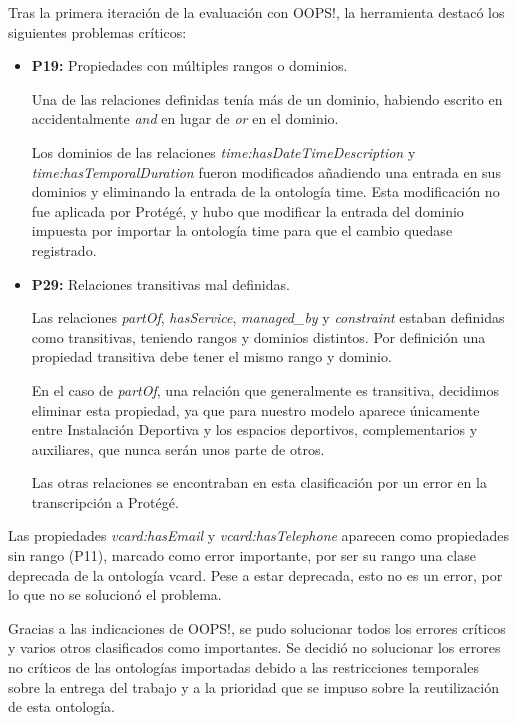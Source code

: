 \documentclass[a4paper,12pt]{article}
\begin{document}
	Tras la primera iteración de la evaluación con OOPS!, la herramienta destacó los siguientes problemas críticos:
	
	\begin{itemize}
		\item \textbf{P19:} Propiedades con múltiples rangos o dominios.
		
		Una de las relaciones definidas tenía más de un dominio, habiendo escrito en  accidentalmente \textit{and} en lugar de \textit{or} en el dominio.
		
		Los dominios de las relaciones \textit{time:hasDateTimeDescription} y \textit{time:hasTemporalDuration} fueron modificados añadiendo una entrada en sus dominios y eliminando la entrada de la ontología time. Esta modificación no fue aplicada por Protégé, y hubo que modificar la entrada del dominio impuesta por importar la ontología time para que el cambio quedase registrado.
		
		\item \textbf{P29:} Relaciones transitivas mal definidas.
		
		Las relaciones \textit{partOf}, \textit{hasService}, \textit{managed\_by} y \textit{constraint} estaban definidas como transitivas, teniendo rangos y dominios distintos. Por definición una propiedad transitiva debe tener el mismo rango y dominio.
		
		En el caso de \textit{partOf}, una relación que generalmente es transitiva, decidimos eliminar esta propiedad, ya que para nuestro modelo aparece únicamente entre Instalación Deportiva y los espacios deportivos, complementarios y auxiliares, que nunca serán unos parte de otros.
		
		Las otras relaciones se encontraban en esta clasificación por un error en la transcripción a Protégé.
	\end{itemize}
	
	Las propiedades \textit{vcard:hasEmail} y \textit{vcard:hasTelephone} aparecen como propiedades sin rango (P11), marcado como error importante, por ser su rango una clase deprecada de la ontología vcard. Pese a estar deprecada, esto no es un error, por lo que no se solucionó el problema.
	
	Gracias a las indicaciones de OOPS!, se pudo solucionar todos los errores críticos y varios otros clasificados como importantes. Se decidió no solucionar los errores no críticos de las ontologías importadas debido a las restricciones temporales sobre la entrega del trabajo y a la prioridad que se impuso sobre la reutilización de esta ontología.
	
\end{document}
